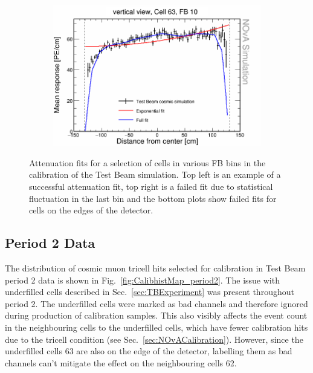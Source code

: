 \begin{figure}[h]
\begin{subfigure}{0.495\textwidth}
  \end{subfigure}
  \begin{subfigure}{0.495\textwidth}
    \includegraphics[width=\linewidth]{Plots/RelativeCalibrationResults/sim_fb10_000_063.png}
  \end{subfigure}
  \caption[Example attenuation fits for simulation]{Attenuation fits for a selection of cells in various \acrshort{FB} bins in the calibration of the Test Beam simulation. Top left is an example of a successful attenuation fit, top right is a failed fit due to statistical fluctuation in the last bin and the bottom plots show failed fits for cells on the edges of the detector.}
  \label{fig:AttenfitResultsSimulation}
\end{figure}

\subsection{Period 2 Data}
The distribution of cosmic muon tricell hits selected for calibration in Test Beam period 2 data is shown in Fig.~\ref{fig:CalibhistMap_period2}.
The issue with underfilled cells described in Sec.~\ref{sec:TBExperiment} was present throughout period 2. The underfilled cells were marked as bad channels and therefore ignored during production of calibration samples. This also visibly affects the event count in the neighbouring cells to the underfilled cells, which have fewer calibration hits due to the tricell condition (see Sec.~\ref{sec:NOvACalibration}). However, since the underfilled cells 63 are also on the edge of the detector, labelling them as bad channels can't mitigate the effect on the neighbouring cells 62.

